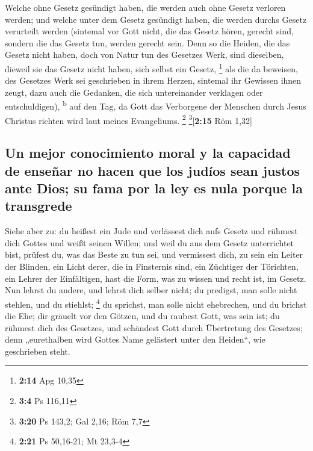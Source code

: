  Welche ohne Gesetz gesündigt haben, die werden auch ohne
Gesetz verloren werden; und welche unter dem Gesetz gesündigt haben, die
werden durchs Gesetz verurteilt werden  (sintemal vor
Gott nicht, die das Gesetz hören, gerecht sind, sondern die das Gesetz
tun, werden gerecht sein.  Denn so die Heiden, die das
Gesetz nicht haben, doch von Natur tun des Gesetzes Werk, sind
dieselben, dieweil sie das Gesetz nicht haben, sich selbst ein Gesetz,
\footnote{\textbf{2:14} Apg 10,35}  als die da beweisen,
des Gesetzes Werk sei geschrieben in ihrem Herzen, sintemal ihr Gewissen
ihnen zeugt, dazu auch die Gedanken, die sich untereinander verklagen
oder entschuldigen), \textsuperscript{b}  auf den Tag, da
Gott das Verborgene der Menschen durch Jesus Christus richten wird laut
meines Evangeliums. \footnote{\textbf{3:4} Ps 116,11}
\footnote{\textbf{3:20} Ps 143,2; Gal 2,16; Röm 7,7}{[}\textbf{2:15} Röm
1,32{]}

\hypertarget{un-mejor-conocimiento-moral-y-la-capacidad-de-enseuxf1ar-no-hacen-que-los-juduxedos-sean-justos-ante-dios-su-fama-por-la-ley-es-nula-porque-la-transgrede}{%
\subsection{Un mejor conocimiento moral y la capacidad de enseñar no
hacen que los judíos sean justos ante Dios; su fama por la ley es nula
porque la
transgrede}\label{un-mejor-conocimiento-moral-y-la-capacidad-de-enseuxf1ar-no-hacen-que-los-juduxedos-sean-justos-ante-dios-su-fama-por-la-ley-es-nula-porque-la-transgrede}}

 Siehe aber zu: du heißest ein Jude und verlässest dich
aufs Gesetz und rühmest dich Gottes  und weißt seinen
Willen; und weil du aus dem Gesetz unterrichtet bist, prüfest du, was
das Beste zu tun sei,  und vermissest dich, zu sein ein
Leiter der Blinden, ein Licht derer, die in Finsternis sind,
 ein Züchtiger der Törichten, ein Lehrer der Einfältigen,
hast die Form, was zu wissen und recht ist, im Gesetz. 
Nun lehrst du andere, und lehrst dich selber nicht; du predigst, man
solle nicht stehlen, und du stiehlst; \footnote{\textbf{2:21} Ps
  50,16-21; Mt 23,3-4}  du sprichst, man solle nicht
ehebrechen, und du brichst die Ehe; dir gräuelt vor den Götzen, und du
raubest Gott, was sein ist;  du rühmest dich des
Gesetzes, und schändest Gott durch Übertretung des Gesetzes;
 denn „eurethalben wird Gottes Name gelästert unter den
Heiden``, wie geschrieben steht.

